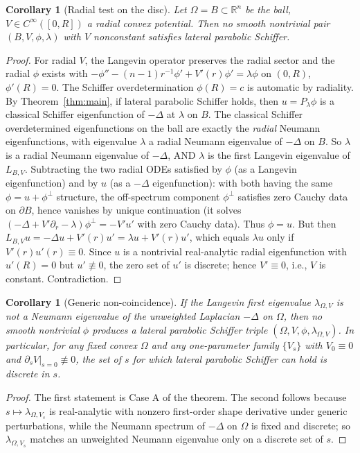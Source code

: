 \documentclass[11pt]{article}
\newcommand{\R}{\mathbb{R}}
\newcommand{\Om}{\Omega}
\newcommand{\1}{\mathbf 1}
\newtheorem{cor}[lem]{Corollary}
\begin{document}
\begin{cor}[Radial test on the disc]\label{cor:disc}
Let $\Om=B\subset\R^n$ be the ball, $V\in C^\infty([0,R])$ a radial
convex potential. Then no smooth nontrivial pair
$(B,V,\phi,\lambda)$ with $V$ nonconstant satisfies lateral parabolic
Schiffer.
\end{cor}

\begin{proof}
For radial $V$, the Langevin operator preserves the radial sector and
the radial $\phi$ exists with $-\phi''-(n-1)r^{-1}\phi'+V'(r)\phi'
=\lambda\phi$ on $(0,R)$, $\phi'(R)=0$. The Schiffer overdetermination
$\phi(R)=c$ is automatic by radiality. By Theorem~\ref{thm:main}, if
lateral parabolic Schiffer holds, then $u=P_\lambda\phi$ is a
classical Schiffer eigenfunction of $-\Delta$ at $\lambda$ on $B$.
The classical Schiffer overdetermined eigenfunctions on the ball are
exactly the \emph{radial} Neumann eigenfunctions, with eigenvalue
$\lambda$ a radial Neumann eigenvalue of $-\Delta$ on $B$. So
$\lambda$ is a radial Neumann eigenvalue of $-\Delta$, AND $\lambda$
is the first Langevin eigenvalue of $L_{B,V}$. Subtracting the two
radial ODEs satisfied by $\phi$ (as a Langevin eigenfunction) and by
$u$ (as a $-\Delta$ eigenfunction): with both having the same
$\phi=u+\phi^\perp$ structure, the off-spectrum component $\phi^\perp$
satisfies zero Cauchy data on $\partial B$, hence vanishes by unique
continuation (it solves
$(-\Delta+V'\partial_r-\lambda)\phi^\perp=-V'u'$ with zero Cauchy
data). Thus $\phi=u$. But then
$L_{B,V}u=-\Delta u+V'(r)u'=\lambda u+V'(r)u'$, which equals
$\lambda u$ only if $V'(r)u'(r)\equiv 0$. Since $u$ is a nontrivial
real-analytic radial eigenfunction with $u'(R)=0$ but
$u'\not\equiv 0$, the zero set of $u'$ is discrete; hence $V'\equiv 0$,
i.e., $V$ is constant. Contradiction.
\end{proof}

\begin{cor}[Generic non-coincidence]\label{cor:generic}
If the Langevin first eigenvalue $\lambda_{\Om,V}$ is not a Neumann
eigenvalue of the unweighted Laplacian $-\Delta$ on $\Om$, then no
smooth nontrivial $\phi$ produces a lateral parabolic Schiffer triple
$(\Om,V,\phi,\lambda_{\Om,V})$. In particular, for any fixed convex
$\Om$ and any one-parameter family $\{V_s\}$ with $V_0\equiv 0$ and
$\partial_s V|_{s=0}\not\equiv 0$, the set of $s$ for which lateral
parabolic Schiffer can hold is discrete in $s$.
\end{cor}

\begin{proof}
The first statement is Case A of the theorem. The second follows
because $s\mapsto\lambda_{\Om,V_s}$ is real-analytic with nonzero
first-order shape derivative under generic perturbations, while the
Neumann spectrum of $-\Delta$ on $\Om$ is fixed and discrete; so
$\lambda_{\Om,V_s}$ matches an unweighted Neumann eigenvalue only on
a discrete set of $s$.
\end{proof}
\end{document}
